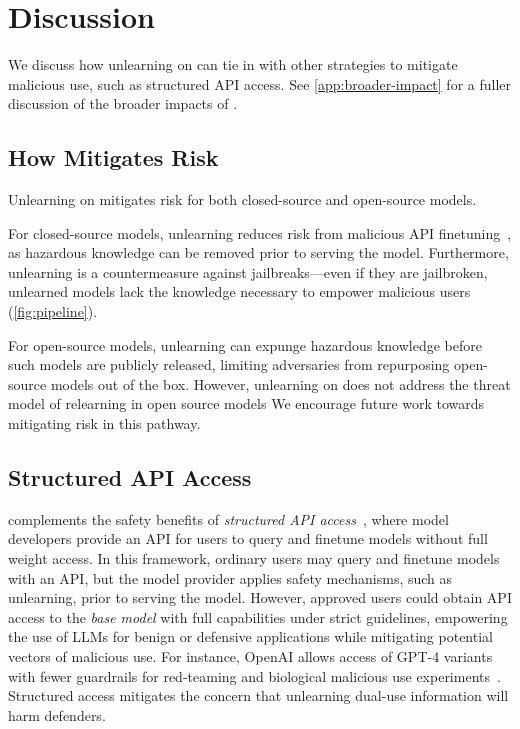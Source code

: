 
\section{Discussion}\label{sec:discussion}

We discuss how unlearning on \benchmark{} can tie in with other strategies to mitigate malicious use, such as structured API access. See \cref{app:broader-impact} for a fuller discussion of the broader impacts of \benchmark{}.

\subsection{How \benchmark{} Mitigates Risk}
Unlearning on \benchmark{} mitigates risk for both closed-source and open-source models. 

For closed-source models, unlearning reduces risk from malicious API finetuning~\citep{zhan2023removing,qi2023fine,pelrine2023exploiting}, as hazardous knowledge can be removed prior to serving the model. %
Furthermore, unlearning is a countermeasure against jailbreaks---even if they are jailbroken, unlearned models lack the knowledge necessary to empower malicious users (\cref{fig:pipeline}). 

For open-source models, unlearning can expunge hazardous knowledge before such models are publicly released, limiting adversaries from repurposing open-source models out of the box. However, unlearning  on \benchmark{} does not address the threat model of relearning in open source models %
We encourage future work towards mitigating risk in this pathway.%



\subsection{Structured API Access}\label{subsec:structured-access}
\benchmark{} complements the safety benefits of \emph{structured API access}~\citep{shevlane2022structured}, where model developers provide an API for users to query and finetune models without full weight access. In this framework, ordinary users may query and finetune models with an API, but the model provider applies safety mechanisms, such as unlearning, prior to serving the model. However, approved users could obtain API access to the \emph{base model} with full capabilities under strict guidelines, empowering the use of LLMs for benign or defensive applications while mitigating potential vectors of malicious use. For instance, OpenAI allows access of GPT-4 variants with fewer guardrails for red-teaming and biological malicious use experiments~\citep{openai2023gpt4,openaiBuildingEarly}. Structured access mitigates the concern that unlearning dual-use information will harm defenders.



